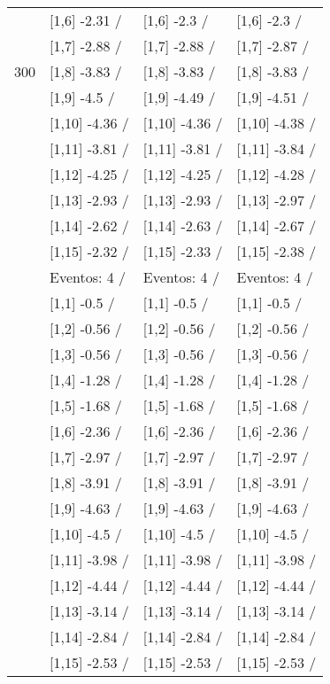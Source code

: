 \begin{table}
\begin{tabular}[t]{llll}
 & {}[1,6] -2.31  / & {}[1,6] -2.3  / & {}[1,6] -2.3  /\\
 & {}[1,7] -2.88  / & {}[1,7] -2.88  / & {}[1,7] -2.87  /\\
300 & {}[1,8] -3.83  / & {}[1,8] -3.83  / & {}[1,8] -3.83  /\\
\addlinespace
 & {}[1,9] -4.5  / & {}[1,9] -4.49  / & {}[1,9] -4.51  /\\
 & {}[1,10] -4.36  / & {}[1,10] -4.36  / & {}[1,10] -4.38  /\\
 & {}[1,11] -3.81  / & {}[1,11] -3.81  / & {}[1,11] -3.84  /\\
 & {}[1,12] -4.25  / & {}[1,12] -4.25  / & {}[1,12] -4.28  /\\
 & {}[1,13] -2.93  / & {}[1,13] -2.93  / & {}[1,13] -2.97  /\\
\addlinespace
 & {}[1,14] -2.62  / & {}[1,14] -2.63  / & {}[1,14] -2.67  /\\
 & {}[1,15] -2.32  / & {}[1,15] -2.33  / & {}[1,15] -2.38  /\\
 & Eventos:  4 / & Eventos:  4 / & Eventos:  4 /\\
 & {}[1,1] -0.5  / & {}[1,1] -0.5  / & {}[1,1] -0.5  /\\
 & {}[1,2] -0.56  / & {}[1,2] -0.56  / & {}[1,2] -0.56  /\\
\addlinespace
 & {}[1,3] -0.56  / & {}[1,3] -0.56  / & {}[1,3] -0.56  /\\
 & {}[1,4] -1.28  / & {}[1,4] -1.28  / & {}[1,4] -1.28  /\\
 & {}[1,5] -1.68  / & {}[1,5] -1.68  / & {}[1,5] -1.68  /\\
 & {}[1,6] -2.36  / & {}[1,6] -2.36  / & {}[1,6] -2.36  /\\
 & {}[1,7] -2.97  / & {}[1,7] -2.97  / & {}[1,7] -2.97  /\\
\addlinespace
500 & {}[1,8] -3.91  / & {}[1,8] -3.91  / & {}[1,8] -3.91  /\\
 & {}[1,9] -4.63  / & {}[1,9] -4.63  / & {}[1,9] -4.63  /\\
 & {}[1,10] -4.5  / & {}[1,10] -4.5  / & {}[1,10] -4.5  /\\
 & {}[1,11] -3.98  / & {}[1,11] -3.98  / & {}[1,11] -3.98  /\\
 & {}[1,12] -4.44  / & {}[1,12] -4.44  / & {}[1,12] -4.44  /\\
\addlinespace
 & {}[1,13] -3.14  / & {}[1,13] -3.14  / & {}[1,13] -3.14  /\\
 & {}[1,14] -2.84  / & {}[1,14] -2.84  / & {}[1,14] -2.84  /\\
 & {}[1,15] -2.53  / & {}[1,15] -2.53  / & {}[1,15] -2.53  /\\
\bottomrule
\end{tabular}
\end{table}
